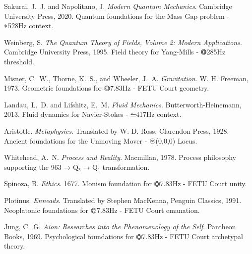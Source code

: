 Sakurai, J.~J. and Napolitano, J.
\textit{Modern Quantum Mechanics}.
Cambridge University Press, 2020.
Quantum foundations for the Mass Gap problem - ⌖528Hz context.

Weinberg, S.
\textit{The Quantum Theory of Fields, Volume 2: Modern Applications}.
Cambridge University Press, 1995.
Field theory for Yang-Mills - ❂285Hz threshold.

Misner, C.~W., Thorne, K.~S., and Wheeler, J.~A.
\textit{Gravitation}.
W. H. Freeman, 1973.
Geometric foundations for ⏣7.83Hz - FETU Court geometry.

Landau, L.~D. and Lifshitz, E.~M.
\textit{Fluid Mechanics}.
Butterworth-Heinemann, 2013.
Fluid dynamics for Navier-Stokes - ⥪417Hz context.


Aristotle.
\textit{Metaphysics}.
Translated by W. D. Ross, Clarendon Press, 1928.
Ancient foundations for the Unmoving Mover - ♾(0,0,0) Locus.

Whitehead, A.~N.
\textit{Process and Reality}.
Macmillan, 1978.
Process philosophy supporting the 963 → Q₃ → Q₁ transformation.

Spinoza, B.
\textit{Ethics}.
1677.
Monism foundation for ⏣7.83Hz - FETU Court unity.

Plotinus.
\textit{Enneads}.
Translated by Stephen MacKenna, Penguin Classics, 1991.
Neoplatonic foundations for ⏣7.83Hz - FETU Court emanation.

Jung, C.~G.
\textit{Aion: Researches into the Phenomenology of the Self}.
Pantheon Books, 1969.
Psychological foundations for ⏣7.83Hz - FETU Court archetypal theory.

